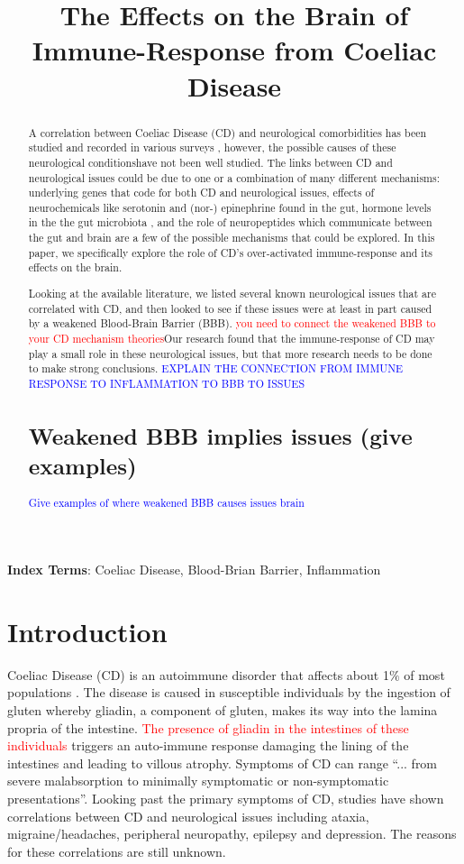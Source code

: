 \documentclass{article}
\title{The Effects on the Brain of Immune-Response from Coeliac Disease}
\begin{document}
\setlength{\parskip}{0pt}

\maketitle
% 
\begin{abstract}
  A correlation between Coeliac Disease (CD) and neurological comorbidities has been studied and recorded in various surveys \cite{Bushara,Cicarelli}, however, the possible causes of these neurological  conditionshave not been well studied. The links between CD and neurological issues could be due to one or a combination of many different mechanisms: underlying genes that code for both CD and neurological issues, effects of neurochemicals like serotonin and (nor-) epinephrine found in the gut, hormone levels in the the gut microbiota \cite{Obrenovich2}, and the role of neuropeptides which communicate  between the gut and brain are a few of the possible mechanisms that could be explored. In this paper, we specifically explore the role of CD's over-activated immune-response and its effects on the brain.
  
  Looking at the available literature, we listed several known neurological issues that are correlated with CD, and then looked to see if these issues were at least in part caused by a weakened Blood-Brain Barrier (BBB). \textcolor{red}{you need to connect the weakened BBB to your CD mechanism theories}Our research found that the immune-response of CD may play a small role in these neurological issues, but that more research needs to be done to make strong conclusions.
  \textcolor{blue}{EXPLAIN THE CONNECTION FROM IMMUNE RESPONSE TO INFLAMMATION TO BBB TO ISSUES}
  
  \section{Weakened BBB implies issues (give examples)}
  \textcolor{blue}{Give examples of where weakened BBB causes issues brain}
  
\end{abstract}
\noindent\textbf{Index Terms}: Coeliac Disease, Blood-Brian Barrier, Inflammation

\section{Introduction}
  Coeliac Disease (CD) is an autoimmune disorder that affects about 1$\%$ of most populations \cite{Lebwohl}. The disease is caused in susceptible individuals by the ingestion of gluten whereby gliadin, a component of gluten, makes its way into the lamina propria of the intestine. \textcolor{red}{The presence of gliadin in the intestines of these individuals}  triggers an auto-immune response damaging the lining of the intestines and leading to villous atrophy. Symptoms of CD can range ``... from severe malabsorption to minimally symptomatic or non-symptomatic presentations''\cite{Lebwohl}.
  Looking past the primary symptoms of CD, studies have shown correlations between CD and neurological issues including ataxia, migraine/headaches, peripheral neuropathy, epilepsy and depression. The reasons for these correlations are still unknown.
\end{document}
